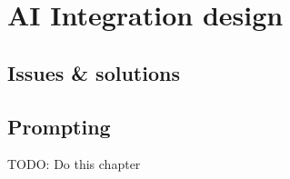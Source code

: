 \chapter{AI Integration design}

\label{cha:design}
\section{Issues \& solutions}
\section{Prompting}



TODO: Do this chapter
